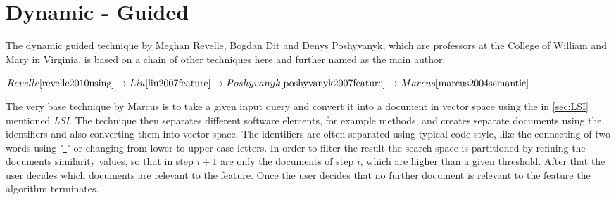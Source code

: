 \section{Dynamic - Guided}
\label{sec:Revelle}
The dynamic guided technique by Meghan Revelle, Bogdan Dit and Denys Poshyvanyk, which are professors at the College of William and Mary in Virginia, is based on a chain of other techniques here and further named as the main author:
\begin{center}
	$Revelle \cite{revelle2010using} \rightarrow Liu \cite{liu2007feature} \rightarrow Poshyvanyk \cite{poshyvanyk2007feature} \rightarrow Marcus \cite{marcus2004semantic}$
\end{center}
The very base technique by Marcus is to take a given input query and convert it into a document in vector space using the in \autoref{sec:LSI} mentioned \textit{LSI}. The technique then separates different software elements, for example methods, and creates separate documents using the identifiers and also converting them into vector space. The identifiers are often separated using typical code style, like the connecting of two words using "\underline{ }" or changing from lower to upper case letters. In order to filter the result the search space is partitioned by refining the documents similarity values, so that in step $i+1$ are only the documents of step $i$, which are higher than a given threshold. After that the user decides which documents are relevant to the feature. Once the user decides that no further document is relevant to the feature the algorithm terminates. \cite{marcus2004semantic} \newline
